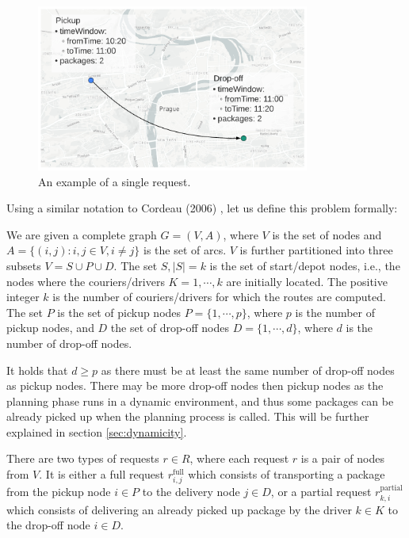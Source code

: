     \begin{figure}[!ht]
        \centering
        \includegraphics[width=0.8\textwidth]{figures/example-request.pdf}
        \caption{An example of a single request.}
        \label{fig:example-request}
    \end{figure}
    
    Using a similar notation to Cordeau (2006) \cite{cordeau}, let us define this problem formally:
    
    We are given a complete graph $G = (V,A)$, where $V$ is the set of nodes and $A = \{(i,j) : i,j \in V, i \neq j \}$ is the set of arcs. $V$ is further partitioned into three subsets $V = S \cup P \cup D$. The set $S, |S| = k$ is the set of start/depot nodes, i.e., the nodes where the couriers/drivers $K = {1,\cdots,k}$ are initially located. The positive integer $k$ is the number of couriers/drivers for which the routes are computed. The set $P$ is the set of pickup nodes $P = \{1,\cdots,p\}$, where $p$ is the number of pickup nodes, and $D$ the set of drop-off nodes $D = \{1,\cdots,d\}$, where $d$ is the number of drop-off nodes.
    
    It holds that $d \geq p$ as there must be at least the same number of drop-off nodes as pickup nodes. There may be more drop-off nodes then pickup nodes as the planning phase runs in a dynamic environment, and thus some packages can be already picked up when the planning process is called. This will be further explained in section \ref{sec:dynamicity}.
    
    There are two types of requests $r \in R$, where each request $r$ is a pair of nodes from $V$. It is either a full request $r^{\mathrm{full}}_{i,j}$ which consists of transporting a package from the pickup node $i \in P$ to the delivery node $j \in D$, or a partial request $r^{\mathrm{partial}}_{k,i}$ which consists of delivering an already picked up package by the driver $k \in K$ to the drop-off node $i \in D$.
    
